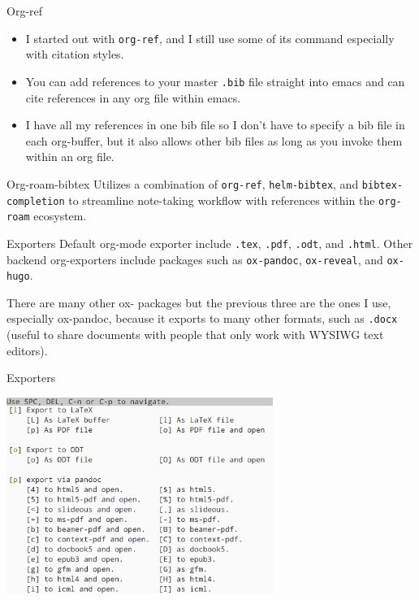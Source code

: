 \documentclass[presentation]{beamer}
\begin{document}
\begin{frame}[label={sec:org1edb5de},fragile]{Org-ref}
 \begin{itemize}
\item I started out with \texttt{org-ref}, and I still use some of its command especially with citation styles.
\item You can add references to your master \texttt{.bib} file straight into emacs and can cite references in any org file within emacs.
\item I have all my references in one bib file so I don't have to specify a bib file in each org-buffer, but it also allows other bib files as long as you invoke them within an org file.
\end{itemize}
\end{frame}

\begin{frame}[label={sec:org143078c},fragile]{Org-roam-bibtex}
 Utilizes a combination of \texttt{org-ref}, \texttt{helm-bibtex}, and \texttt{bibtex-completion} to streamline note-taking workflow with references within the \texttt{org-roam} ecosystem.
\end{frame}
\begin{frame}[label={sec:org715788e},fragile]{Exporters}
 Default org-mode exporter include \texttt{.tex}, \texttt{.pdf}, \texttt{.odt}, and \texttt{.html}. Other backend org-exporters include packages such as \texttt{ox-pandoc}, \texttt{ox-reveal}, and \texttt{ox-hugo}.

There are many other ox- packages but the previous three are the ones I use, especially ox-pandoc, because it exports to many other formats, such as \texttt{.docx} (useful to share documents with people that only work with WYSIWG text editors).
\end{frame}

\begin{frame}[label={sec:org658897e}]{Exporters}
\begin{center}
\includegraphics[width=0.65\textwidth]{4.png}
\end{center}
\end{frame}
\end{document}
